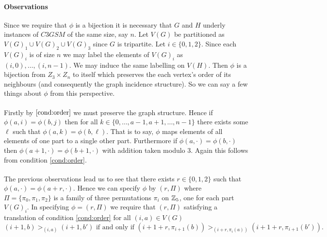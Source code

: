  \paragraph{Observations}
 Since we require that $\phi$ is a bijection it is necessary that $G$ and $H$ underly instances of $C3GSM$ of the same size, say $n$. Let $V(G)$ be partitioned as $V(G)_1 \cup V(G)_2 \cup V(G)_3$ since $G$ is tripartite. Let $i \in \{0,1,2\}$. Since each $V(G)_i$ is of size $n$ we may label the elements of $V(G)_i$ as $(i,0), \dots, (i,n-1)$. We may induce the same labelling on $V(H)$. Then $\phi$ is a bijection from $Z_3 \times Z_n$ to itself which preserves the each vertex's order of its neighbours (and consequently the graph incidence structure). So we can say a few things about $\phi$ from this perspective.
 \paragraph{} Firstly by $\ref{cond:order}$ we must preserve the graph structure. Hence if $\phi(a,i) = \phi(b, j)$ then for all $k \in \{0,\dots,a-1,a+1,\dots,n-1\}$ there exists some $\ell$ such that $\phi(a,k) = \phi(b,\ell)$. That is to say, $\phi$ maps elements of all elements of one part to a single other part. Furthermore if $\phi(a,\cdot) = \phi(b,\cdot)$ then $\phi(a+1,\cdot) = \phi(b+1, \cdot)$ with addition taken modulo $3$. Again this follows from condition \ref{cond:order}.
\paragraph{}
The previous observations lead us to see that there exists $r \in \{0,1,2\}$ such that $\phi(a, \cdot) = \phi(a+r,\cdot)$. Hence we can specify $\phi$ by $(r,\Pi)$ where $\Pi = \{\pi_0, \pi_1,\pi_2\}$ is a family of three permutations $\pi_i$ on $\mathbb{Z}_5$, one for each part $V(G)_i$. In specifying $\phi=(r,\Pi)$ we require that $(r,\Pi)$ satisfying a translation of condition \ref{cond:order} for all $(i,a) \in V(G)$
\begin{equation}\label{cond:orderT}
(i+1,b) >_{(i,a)} (i+1, b') \text{ if and only if } (i+1+r, \pi_{i+1}(b)) >_{(i+r,\pi_i(a))} (i+1+r, \pi_{i+1}(b')).
\end{equation}
